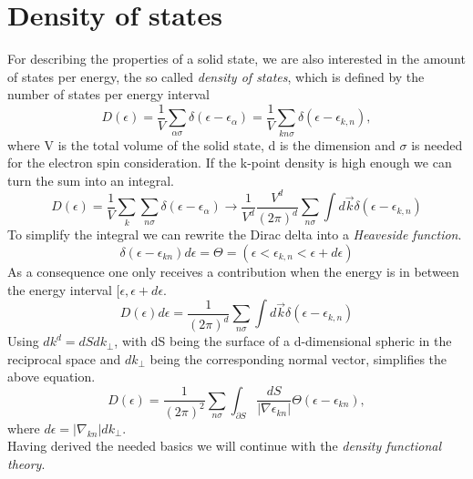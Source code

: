 	\section{Density of states}
		For describing the properties of a solid state, we are also interested in the amount of states per energy, the so called \textit{density of states}, which is defined by the number of states per energy interval 
		\begin{equation}
			D(\epsilon) = \frac{1}{V} \sum_{\alpha \sigma} \delta (\epsilon - \epsilon_\alpha) = \frac{1}{V} \sum_{k n \sigma} \delta (\epsilon - \epsilon_{k,n}), 
		\end{equation}
		where V is the total volume of the solid state, d is the dimension and $\sigma$ is needed for the electron spin consideration. If the k-point density is high enough we can turn the sum into an integral.
		\begin{equation}
			D(\epsilon) = \frac{1}{V} \sum_k \sum_{n \sigma} \delta (\epsilon - \epsilon_\alpha) \rightarrow \frac{1}{V^d} \frac{V^d}{(2\pi)^d} \sum_{n \sigma} \int d\vec k \delta (\epsilon - \epsilon_{k,n}) 
			\label{eq:dosInt}	
		\end{equation} 
		To simplify the integral we can rewrite the Dirac delta into a \textit{Heaveside function}.
		\begin{equation}
			\delta(\epsilon - \epsilon_{kn})d\epsilon = \Theta = ( \epsilon < \epsilon_{k,n} < \epsilon +d\epsilon)
		\end{equation}
		As a consequence one only receives a contribution when the energy is in between the energy interval $[\epsilon, \epsilon + d\epsilon$.
		\begin{equation}
			D(\epsilon) d\epsilon = \frac{1}{(2\pi)^d} \sum_{n \sigma} \int d\vec k \delta (\epsilon - \epsilon_{k,n})
		\end{equation} 
		Using $dk^d = dS dk_\perp$, with dS being the surface of a d-dimensional spheric in the reciprocal space and $dk_\perp$ being the corresponding normal vector, simplifies the above equation.
		\begin{equation}
			D(\epsilon) = \frac{1}{(2\pi)^2} \sum_{n \sigma} \int_{\partial S} \frac{d S}{|\nabla \epsilon_{k n}|} \Theta(\epsilon - \epsilon_{k n}),
		\end{equation}
		where $d\epsilon = |\nabla_{kn}| dk_\perp$.\\
		Having derived the needed basics we will continue with the \textit{density functional theory}.
		
		
			
		
		
	
		
	
	
		
